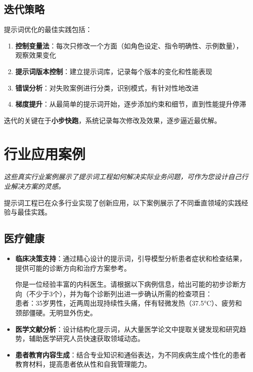 \documentclass[12pt]{ctexart}
\newcommand{\chapternote}[1]{\vspace{-0.3cm}\par\noindent\textit{\small #1}\vspace{0.3cm}}
\begin{document}
\subsection{迭代策略}
提示词优化的最佳实践包括：
\begin{enumerate}
    \item \textbf{控制变量法}：每次只修改一个方面（如角色设定、指令明确性、示例数量），观察效果变化
    \item \textbf{提示词版本控制}：建立提示词库，记录每个版本的变化和性能表现
    \item \textbf{错误分析}：对失败案例进行分类，识别模式，有针对性地改进
    \item \textbf{梯度提升}：从最简单的提示词开始，逐步添加约束和细节，直到性能提升停滞
\end{enumerate}

迭代的关键在于\textbf{小步快跑}，系统记录每次修改及效果，逐步逼近最优解。

\section{行业应用案例}
\chapternote{这些真实行业案例展示了提示词工程如何解决实际业务问题，可作为您设计自己行业解决方案的灵感。}

提示词工程已在众多行业实现了创新应用，以下案例展示了不同垂直领域的实践经验与最佳实践。

\subsection{医疗健康}

\begin{itemize}
  \item \textbf{临床决策支持}：通过精心设计的提示词，引导模型分析患者症状和检查结果，提供可能的诊断方向和治疗方案参考。
  
  \begin{promptbox}
  你是一位经验丰富的内科医生。请根据以下病例信息，给出可能的初步诊断方向（不少于3个），并为每个诊断列出进一步确认所需的检查项目：\\
  患者：35岁男性，近两周出现持续性头痛，伴有轻微发热（37.5°C）、疲劳和颈部僵硬。无明显外伤史。
  \end{promptbox}
  
  \item \textbf{医学文献分析}：设计结构化提示词，从大量医学论文中提取关键发现和研究趋势，辅助医学研究人员快速获取领域动态。
  
  \item \textbf{患者教育内容生成}：结合专业知识和通俗表达，为不同疾病生成个性化的患者教育材料，提高患者依从性和自我管理能力。
\end{itemize}
\end{document}
